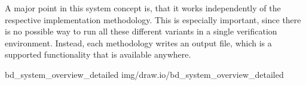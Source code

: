 A major point in this system concept is, that it works independently of the respective implementation methodology.
This is especially important, since there is no possible way to run all these different variants in a single verification environment.
Instead, each methodology writes an output file, which is a supported functionality that is available anywhere.

 {bd_system_overview_detailed} {img/draw.io/bd_system_overview_detailed}


